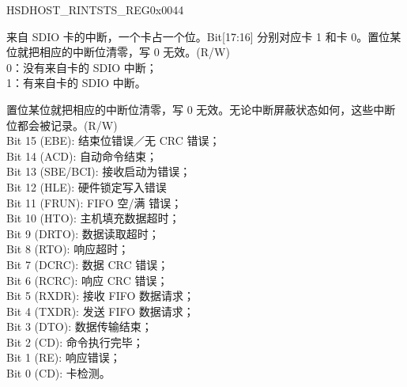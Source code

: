 \begin{register}{H}{SDHOST\_RINTSTS\_REG}{0x{}0044}\label{regdesc:RINTSTSREG}
%
%
%
\regnewline%
\begin{regdesc}\begin{reglist}
\item [SDHOST\_SDIO\_INTERRUPT\_RAW] 来自 SDIO 卡的中断，一个卡占一个位。Bit[17:16] 分别对应卡 1 和卡 0。置位某位就把相应的中断位清零，写 0 无效。(R/W)\\
0：没有来自卡的 SDIO 中断；\\
1：有来自卡的 SDIO 中断。
\item [SDHOST\_INT\_STATUS\_RAW] 置位某位就把相应的中断位清零，写 0 无效。无论中断屏蔽状态如何，这些中断位都会被记录。(R/W)\\
Bit 15 (EBE): 结束位错误／无 CRC 错误；\\
Bit 14 (ACD): 自动命令结束；\\
Bit 13 (SBE/BCI): 接收启动为错误；\\
Bit 12 (HLE): 硬件锁定写入错误\\
Bit 11 (FRUN): FIFO 空/满 错误；\\
Bit 10 (HTO): 主机填充数据超时；\\
Bit 9 (DRTO): 数据读取超时；\\
Bit 8 (RTO): 响应超时； \\
Bit 7 (DCRC): 数据 CRC 错误； \\
Bit 6 (RCRC): 响应 CRC 错误； \\
Bit 5 (RXDR): 接收 FIFO 数据请求； \\
Bit 4 (TXDR): 发送 FIFO 数据请求； \\
Bit 3 (DTO): 数据传输结束； \\
Bit 2 (CD): 命令执行完毕； \\
Bit 1 (RE): 响应错误；\\
Bit 0 (CD): 卡检测。
\end{reglist}\end{regdesc}
\end{register}


